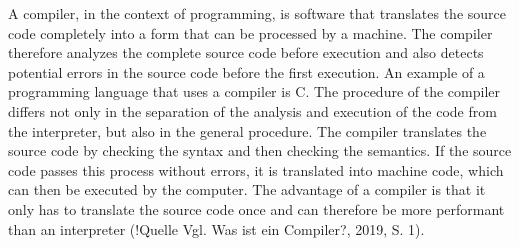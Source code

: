 A compiler, in the context of programming, is software that translates the source code completely into a form that can be processed by a machine. The compiler therefore analyzes the complete source code before execution and also detects potential errors in the source code before the first execution. An example of a programming language that uses a compiler is C.
The procedure of the compiler differs not only in the separation of the analysis and execution of the code from the interpreter, but also in the general procedure.
The compiler translates the source code by checking the syntax and then checking the semantics. If the source code passes this process without errors, it is translated into machine code, which can then be executed by the computer.
The advantage of a compiler is that it only has to translate the source code once and can therefore be more performant than an interpreter (!Quelle Vgl. Was ist ein Compiler?, 2019, S. 1).

